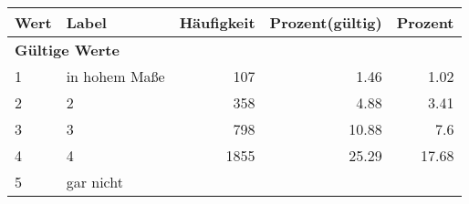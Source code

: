      \begin{longtable}{lXrrr}
     \toprule
     \textbf{Wert} & \textbf{Label} & \textbf{Häufigkeit} & \textbf{Prozent(gültig)} & \textbf{Prozent} \\
     \endhead
     \midrule
     \multicolumn{5}{l}{\textbf{Gültige Werte}}\\

     1 &
     \multicolumn{1}{X}{ in hohem Maße   } &


       \num{107} &
       \num[round-mode=places,round-precision=2]{1.46} &
         \num[round-mode=places,round-precision=2]{1.02} \\

     2 &
     \multicolumn{1}{X}{ 2   } &


       \num{358} &
       \num[round-mode=places,round-precision=2]{4.88} &
         \num[round-mode=places,round-precision=2]{3.41} \\

     3 &
     \multicolumn{1}{X}{ 3   } &


       \num{798} &
       \num[round-mode=places,round-precision=2]{10.88} &
         \num[round-mode=places,round-precision=2]{7.6} \\

     4 &
     \multicolumn{1}{X}{ 4   } &


       \num{1855} &
       \num[round-mode=places,round-precision=2]{25.29} &
         \num[round-mode=places,round-precision=2]{17.68} \\

     5 &
     \multicolumn{1}{X}{ gar nicht   } &



\end{longtable}
